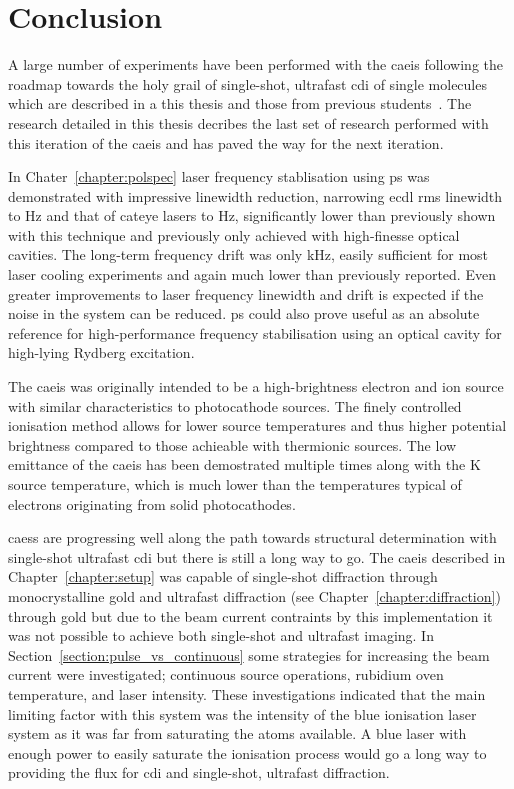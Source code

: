 \chapter{Conclusion}

A large number of experiments have been performed with the \gls{caeis} following the roadmap towards the holy grail of single-shot, ultrafast \gls{cdi} of single molecules which are described in a this thesis and those from previous students~\cite{sheludko_shaped_2010,bell_cold_2011,saliba_cold_2011,mcculloch_generation_2013,taylor_rydberg_2013,tielen_development_2015,murphy_measurement_2017,speirs_electron_2017}.
The research detailed in this thesis decribes the last set of research performed with this iteration of the \gls{caeis} and has paved the way for the next iteration.

In Chater~\ref{chapter:polspec} laser frequency stablisation using \gls{ps} was demonstrated with impressive linewidth reduction, narrowing \gls{ecdl} \gls{rms} linewidth to \unit[600]{Hz} and that of cateye lasers to \unit[360]{Hz}, significantly lower than previously shown with this technique and previously only achieved with high-finesse optical cavities.
The long-term frequency drift was only \unit[51]{kHz}, easily sufficient for most laser cooling experiments and again much lower than previously reported.
Even greater improvements to laser frequency linewidth and drift is expected if the noise in the system can be reduced.
\Gls{ps} could also prove useful as an absolute reference for high-performance frequency stabilisation using an optical cavity for high-lying Rydberg excitation.

The \gls{caeis} was originally intended to be a high-brightness electron and ion source with similar characteristics to photocathode sources.
The finely controlled ionisation method allows for lower source temperatures and thus higher potential brightness compared to those achieable with thermionic sources.
The low emittance of the \gls{caeis} has been demostrated multiple times along with the \unit[10]{K} source temperature, which is much lower than the temperatures typical of electrons originating from solid photocathodes.

\Glspl{caes} are progressing well along the path towards structural determination with single-shot ultrafast \gls{cdi} but there is still a long way to go.
The \gls{caeis} described in Chapter~\ref{chapter:setup} was capable of single-shot diffraction through monocrystalline gold and ultrafast diffraction (see Chapter~\ref{chapter:diffraction}) through gold but due to the beam current contraints by this implementation it was not possible to achieve both single-shot and ultrafast imaging.
In Section~\ref{section:pulse_vs_continuous} some strategies for increasing the beam current were investigated; continuous source operations, rubidium oven temperature, and laser intensity.
These investigations indicated that the main limiting factor with this system was the intensity of the blue ionisation laser system as it was far from saturating the atoms available.
A blue laser with enough power to easily saturate the ionisation process would go a long way to providing the flux for \gls{cdi} and single-shot, ultrafast diffraction.

